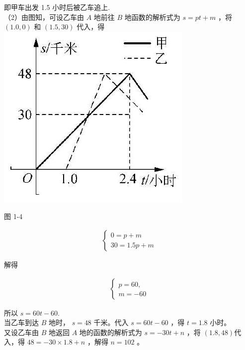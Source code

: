 \documentclass[10pt]{article}
\begin{document}
即甲车出发 1.5 小时后被乙车追上.\\
（2）由图知，可设乙车由 $A$ 地前往 $B$ 地函数的解析式为 $s=p t+m$ ，将 $(1.0,0)$ 和 $(1.5,30)$ 代入，得\\
\includegraphics[max width=\textwidth, center]{2024_10_30_1bf34f7aeb61f11d11d3g-014}

图 1-4

\begin{align*}
\left\{\begin{array}{l}
0=p+m \\
30=1.5 p+m
\end{array}\right.
\end{align*}

解得

\begin{align*}
\left\{\begin{array}{l}
p=60, \\
m=-60
\end{array}\right.
\end{align*}

所以 $s=60 t-60$.\\
当乙车到达 $B$ 地时， $s=48$ 千米。代入 $s=60 t-60$ ，得 $t=1.8$ 小时。\\
又设乙车由 $B$ 地返回 $A$ 地的函数的解析式为 $s=-30 t+n$ ，将 $(1.8,48)$代入，得 $48=-30 \times 1.8+n$ ，解得 $n=102$ 。
\end{document}
